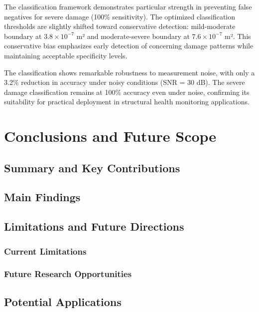 \documentclass[12pt,a4paper]{report}
\begin{document}
The classification framework demonstrates particular strength in preventing false negatives for severe damage (100\% sensitivity). The optimized classification thresholds are slightly shifted toward conservative detection: mild-moderate boundary at $3.8 \times 10^{-7}$ m² and moderate-severe boundary at $7.6 \times 10^{-7}$ m². This conservative bias emphasizes early detection of concerning damage patterns while maintaining acceptable specificity levels.

The classification shows remarkable robustness to measurement noise, with only a 3.2\% reduction in accuracy under noisy conditions (SNR = 30 dB). The severe damage classification remains at 100\% accuracy even under noise, confirming its suitability for practical deployment in structural health monitoring applications.




\chapter{Conclusions and Future Scope}
\label{chap:conclusions}

\section{Summary and Key Contributions}



\section{Main Findings}



\section{Limitations and Future Directions}

\subsection{Current Limitations}




\subsection{Future Research Opportunities}



\section{Potential Applications}







\appendix
\end{document}
